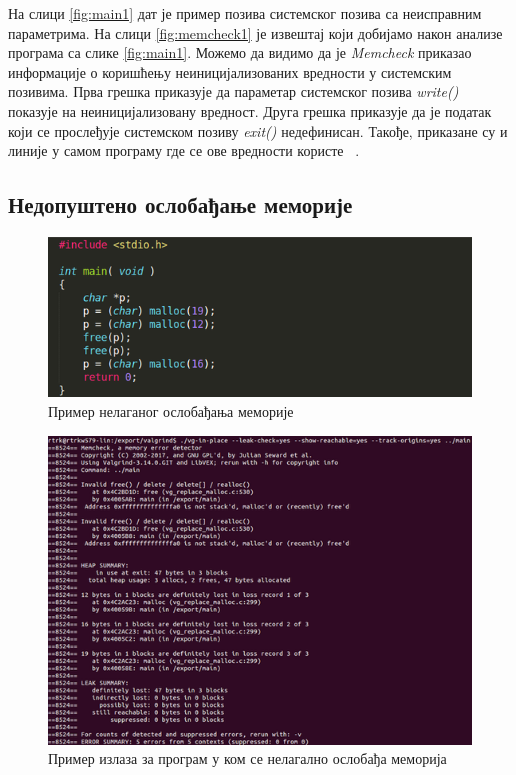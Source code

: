 \documentclass[12pt,oneside]{memoir}
\begin{document}
\indent На слици \ref{fig:main1} дат је пример позива системског позива са неисправним параметрима. На слици \ref{fig:memcheck1} је извештај који добијамо након анализе програма са слике \ref{fig:main1}. Можемо да видимо да је \textit{Memcheck} приказао информације о коришћењу неиницијализованих вредности у системским позивима. Прва грешка приказује да параметар системског позива \textit{write()} показује на неиницијализовану вредност. Друга грешка приказује да је податак који се прослеђује системском позиву \textit{exit()} недефинисан. Такође, приказане су и линије у самом програму где се ове вредности користе ~\cite{memcheckRef}.

\subsection{Недопуштено ослобађање меморије}

\begin{figure}[h!]
\begin{center}
\includegraphics[scale=0.75]{slika5.png}
\end{center}
\caption{Пример нелаганог ослобађања меморије}
\label{fig:main2}
\end{figure}

\begin{figure}[h!]
\begin{center}
\includegraphics[scale=0.75]{slika6.png}
\end{center}
\caption{Пример излаза за програм у ком се нелагално ослобађа меморија}
\label{fig:memcheck2}
\end{figure}
\end{document}

